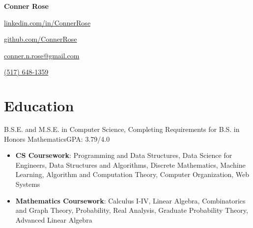 \documentclass[letterpaper,11pt]{article}
\begin{document}
\begin{center}
    \Huge{\textbf{Conner Rose}} \\
    \begin{itemize*}
        \item[] \href{https://linkedin.com/in/ConnerRose}{linkedin.com/in/ConnerRose}
        \item \href{https://github.com/ConnerRose}{github.com/ConnerRose}
        \item \href{mailto:conner.n.rose@gmail.com}{conner.n.rose@gmail.com}
        \item \href{tel:+15176481359}{(517) 648-1359}
    \end{itemize*}
\end{center}

\section{Education}
{B.S.E. and M.S.E. in Computer Science, Completing Requirements for B.S. in
    Honors Mathematics}{GPA: 3.79/4.0}
\begin{itemize}
    \item \textbf{CS Coursework}: Programming and Data Structures, Data Science
          for Engineers, Data Structures and Algorithms, Discrete Mathematics,
          Machine Learning, Algorithm and Computation Theory, Computer
          Organization, Web Systems
    \item \textbf{Mathematics Coursework}: Calculus I-IV, Linear Algebra,
          Combinatorics and Graph Theory, Probability, Real Analysis, Graduate
          Probability Theory, Advanced Linear Algebra
\end{itemize}
\end{document}
